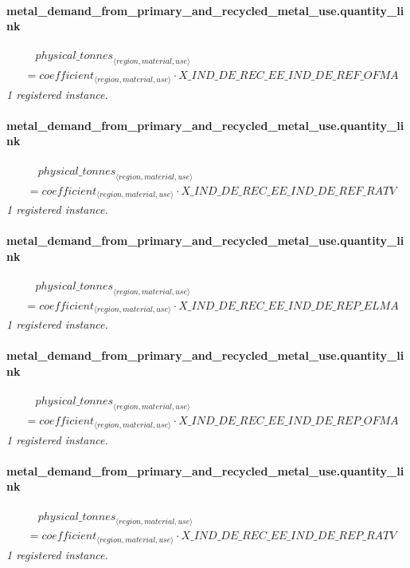 \documentclass[11pt]{article}
\begin{document}
\paragraph{metal\_demand\_from\_primary\_and\_recycled\_metal\_use.quantity\_link}
\begin{align*}
&\quad {physical\_tonnes}_{\langle region, material, use\rangle}\\
&= coefficient_{\langle region, material, use\rangle} \cdot X\_IND\_DE\_REC\_EE\_IND\_DE\_REF\_OFMA
\end{align*}
\noindent\emph{1 registered instance.}\par
\paragraph{metal\_demand\_from\_primary\_and\_recycled\_metal\_use.quantity\_link}
\begin{align*}
&\quad {physical\_tonnes}_{\langle region, material, use\rangle}\\
&= coefficient_{\langle region, material, use\rangle} \cdot X\_IND\_DE\_REC\_EE\_IND\_DE\_REF\_RATV
\end{align*}
\noindent\emph{1 registered instance.}\par
\paragraph{metal\_demand\_from\_primary\_and\_recycled\_metal\_use.quantity\_link}
\begin{align*}
&\quad {physical\_tonnes}_{\langle region, material, use\rangle}\\
&= coefficient_{\langle region, material, use\rangle} \cdot X\_IND\_DE\_REC\_EE\_IND\_DE\_REP\_ELMA
\end{align*}
\noindent\emph{1 registered instance.}\par
\paragraph{metal\_demand\_from\_primary\_and\_recycled\_metal\_use.quantity\_link}
\begin{align*}
&\quad {physical\_tonnes}_{\langle region, material, use\rangle}\\
&= coefficient_{\langle region, material, use\rangle} \cdot X\_IND\_DE\_REC\_EE\_IND\_DE\_REP\_OFMA
\end{align*}
\noindent\emph{1 registered instance.}\par
\paragraph{metal\_demand\_from\_primary\_and\_recycled\_metal\_use.quantity\_link}
\begin{align*}
&\quad {physical\_tonnes}_{\langle region, material, use\rangle}\\
&= coefficient_{\langle region, material, use\rangle} \cdot X\_IND\_DE\_REC\_EE\_IND\_DE\_REP\_RATV
\end{align*}
\noindent\emph{1 registered instance.}\par
\end{document}
